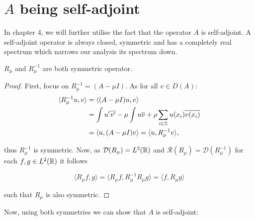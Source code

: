 \section{\texorpdfstring{$A$ being self-adjoint}{A being self-adjoint}}

In chapter 4, we will further utilise the fact that the operator $A$ is self-adjoint. A self-adjoint operator is always closed, symmetric and has a completely real spectrum which narrows our analysis its spectrum down. 

\begin{theorem} \label{2.2:thm-RmuSymmetric}
	$R_{\mu}$ and $R_{\mu}^{-1}$ are both symmetric operator.
	
	\begin{proof}
		First, focus on $R_{\mu}^{-1} = (A - \mu I)$. As for all $v \in D(A)$:
			\begin{align*}
				\langle R_{\mu}^{-1} u, v \rangle & = \langle (A - \mu I) u, v \rangle \\
					& = \int u'\overline{v'} -  \mu \int u \overline{v} + \rho \sum_{i \in \mathbb{Z}} u(x_{i}) \overline{v(x_{i})} \\
					& = \langle u, (A - \mu I) v \rangle = \langle u,  R_{\mu}^{-1} v \rangle,
			\end{align*}

		thus $R_{\mu}^{-1}$ is symmetric. Now, as $\mathcal{D}(R_{\mu}) = L^{2}(\mathbb{R})$ and $\mathcal{R}(R_{\mu}) = \mathcal{D}(R_{\mu}^{-1})$ for each $f, g \in L^{2}(\mathbb{R})$ it follows
		
		\[  \langle R_{\mu} f, g \rangle =  \langle R_{\mu} f, R_{\mu}^{-1} R_{\mu} g \rangle = \langle f, R_{\mu} g \rangle \]
		
		such that $R_{\mu}$ is also symmetric.
	\end{proof}
\end{theorem}

Now, using both symmetries we can show that $A$ is self-adjoint:


